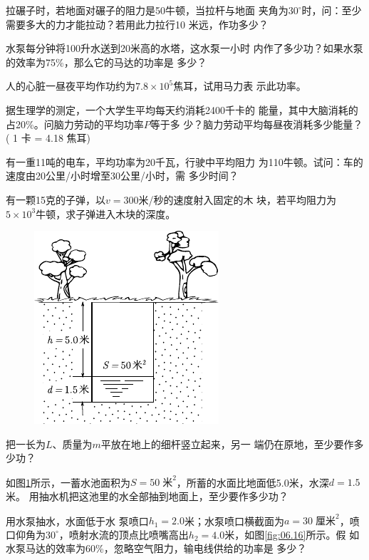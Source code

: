 \begin{exercises}

\exercise 拉碾子时，若地面对碾子的阻力是50牛顿，当拉杆与地面
夹角为$ 30 ^ { \circ } $时，问：至少需要多大的力才能拉动？若用此力拉行10
米远，作功多少？

\exercise 水泵每分钟将100升水送到20米高的水塔，这水泵一小时
内作了多少功？如果水泵的效率为75\%，那么它的马达的功率是
多少？

\exercise 人的心脏一昼夜平均作功约为$ 7.8 \times 10 ^ 5 $焦耳，试用马力表
示此功率。

\exercise 据生理学的测定，一个大学生平均每天约消耗2400千卡的
能量，其中大脑消耗的占20\%。问脑力劳动的平均功率$ P $等于多
少？脑力劳动平均每昼夜消耗多少能量？( 1 卡 = 4.18 焦耳)

\exercise 有一重11吨的电车，平均功率为20千瓦，行驶中平均阻力
为110牛顿。试问：车的速度由20公里/小时增至30公里/小时，需
多少时间？

\exercise 有一颗15克的子弹，以$ v = 300 $米/秒的速度射入固定的木
块，若平均阻力为$ 5 \times 10 ^ { 3 } $牛顿，求子弹进入木块的深度。

\begin{figure}
    \centering
    \includegraphics{figure/fig06.15}
    \caption{}
    \label{fig:06.15}
\end{figure}
\exercise 把一长为$ L $、质量为$ m $平放在地上的细杆竖立起来，另一
端仍在原地，至少要作多少功？

\exercise 如图\ref{fig:06.15}\;所示，一蓄水池面积为$ S = 50 \;\text{米} ^ 2 $，所蓄的水面比地面低5.0米，水深$ d=1.5 $米。
用抽水机把这池里的水全部抽到地面上，至少要作多少功？

\exercise 用水泵抽水，水面低于水
泵喷口$ h _ { 1 } = 2.0 $米；水泵喷口横截面为$ a = 3 0 \;\text{厘米} ^ 2 $，喷口仰角为$
30 ^ { \circ } $，喷射水流的顶点比喷嘴高出$ h _ { 2 } = 4.0 $米，如图\ref{fig:06.16}\;所示。假
如水泵马达的效率为60\%，忽略空气阻力，输电线供给的功率是
多少？


\end{exercises}
